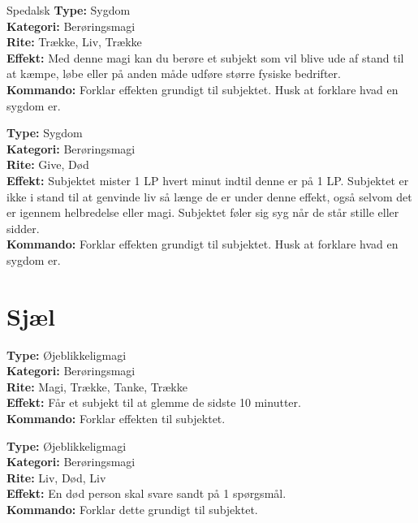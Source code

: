 \begin{sygdom*}Spedalsk
\textbf{Type:} Sygdom\\
\textbf{Kategori:} Berøringsmagi\\
\textbf{Rite:} Trække, Liv, Trække\\
\textbf{Effekt:} Med denne magi kan du berøre et subjekt som vil blive ude af stand til at kæmpe, løbe eller på anden måde udføre større fysiske bedrifter.\\
\textbf{Kommando:} Forklar effekten grundigt til subjektet. Husk at forklare hvad en sygdom er.
\end{sygdom*}

\begin{sygdom*}[Pest]
\textbf{Type:} Sygdom\\
\textbf{Kategori:} Berøringsmagi\\
\textbf{Rite:} Give, Død\\
\textbf{Effekt:} Subjektet mister 1 LP hvert minut indtil denne er på 1 LP. Subjektet er ikke i stand til at genvinde liv så længe de er under denne effekt, også selvom det er igennem helbredelse eller magi. Subjektet føler sig syg når de står stille eller sidder.\\
\textbf{Kommando:} Forklar effekten grundigt til subjektet. Husk at forklare hvad en sygdom er.
\end{sygdom*}

\section{Sjæl}
\begin{nSjæl*}[Glemsel]
\textbf{Type:} Øjeblikkeligmagi\\
\textbf{Kategori:} Berøringsmagi\\
\textbf{Rite:} Magi, Trække, Tanke, Trække\\
\textbf{Effekt:} Får et subjekt til at glemme de sidste 10 minutter.\\
\textbf{Kommando:} Forklar effekten til subjektet.
\end{nSjæl*}

\begin{nSjæl*}
\textbf{Type:} Øjeblikkeligmagi\\
\textbf{Kategori:} Berøringsmagi\\
\textbf{Rite:} Liv, Død, Liv\\
\textbf{Effekt:} En død person skal svare sandt på 1 spørgsmål.\\
\textbf{Kommando:} Forklar dette grundigt til subjektet.
\end{nSjæl*}

